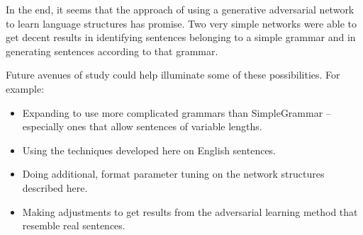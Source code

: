\documentclass[12pt]{article}
\begin{document}
In the end, it seems that the approach of using a generative adversarial network to learn language structures has promise. Two very simple networks were able to get decent results in identifying sentences belonging to a simple grammar and in generating sentences according to that grammar.

Future avenues of study could help illuminate some of these possibilities. For example:

\begin{itemize}
    \item Expanding to use more complicated grammars than SimpleGrammar -- especially ones that allow sentences of variable lengths.
    \item Using the techniques developed here on English sentences.
    \item Doing additional, format parameter tuning on the network structures described here.
    \item Making adjustments to get results from the adversarial learning method that resemble real sentences.
\end{itemize}



\end{document}
